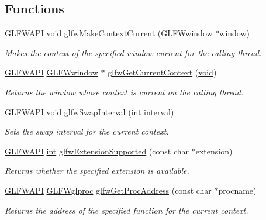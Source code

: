 \subsection*{Functions}
\begin{DoxyCompactItemize}
\item 
\hyperlink{glfw3_8h_a56da5036b2cc259351ae22fd6439bb47}{G\+L\+F\+W\+A\+P\+I} \hyperlink{wglew_8h_aeea6e3dfae3acf232096f57d2d57f084}{void} \hyperlink{group__context_gafd76c93e15ec8b0b90506a9936a46185}{glfw\+Make\+Context\+Current} (\hyperlink{group__window_ga3c96d80d363e67d13a41b5d1821f3242}{G\+L\+F\+Wwindow} $\ast$window)
\begin{DoxyCompactList}\small\item\em Makes the context of the specified window current for the calling thread. \end{DoxyCompactList}\item 
\hyperlink{glfw3_8h_a56da5036b2cc259351ae22fd6439bb47}{G\+L\+F\+W\+A\+P\+I} \hyperlink{group__window_ga3c96d80d363e67d13a41b5d1821f3242}{G\+L\+F\+Wwindow} $\ast$ \hyperlink{group__context_gac28d98c655377d81a516bf5ef90780c8}{glfw\+Get\+Current\+Context} (\hyperlink{wglew_8h_aeea6e3dfae3acf232096f57d2d57f084}{void})
\begin{DoxyCompactList}\small\item\em Returns the window whose context is current on the calling thread. \end{DoxyCompactList}\item 
\hyperlink{glfw3_8h_a56da5036b2cc259351ae22fd6439bb47}{G\+L\+F\+W\+A\+P\+I} \hyperlink{wglew_8h_aeea6e3dfae3acf232096f57d2d57f084}{void} \hyperlink{group__context_ga12a595c06947cec4967c6e1f14210a8a}{glfw\+Swap\+Interval} (\hyperlink{wglew_8h_a500a82aecba06f4550f6849b8099ca21}{int} interval)
\begin{DoxyCompactList}\small\item\em Sets the swap interval for the current context. \end{DoxyCompactList}\item 
\hyperlink{glfw3_8h_a56da5036b2cc259351ae22fd6439bb47}{G\+L\+F\+W\+A\+P\+I} \hyperlink{wglew_8h_a500a82aecba06f4550f6849b8099ca21}{int} \hyperlink{group__context_ga9a28c712d35f9e43534e1d03b051c04c}{glfw\+Extension\+Supported} (const char $\ast$extension)
\begin{DoxyCompactList}\small\item\em Returns whether the specified extension is available. \end{DoxyCompactList}\item 
\hyperlink{glfw3_8h_a56da5036b2cc259351ae22fd6439bb47}{G\+L\+F\+W\+A\+P\+I} \hyperlink{group__context_ga3d47c2d2fbe0be9c505d0e04e91a133c}{G\+L\+F\+Wglproc} \hyperlink{group__context_ga0e8af175218929615c16e74938c10f2a}{glfw\+Get\+Proc\+Address} (const char $\ast$procname)
\begin{DoxyCompactList}\small\item\em Returns the address of the specified function for the current context. \end{DoxyCompactList}\end{DoxyCompactItemize}


